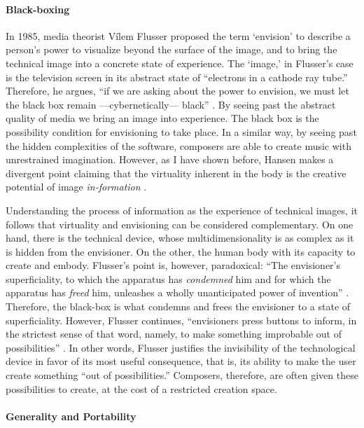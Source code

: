 	\paragraph{Black-boxing}

	In 1985, media theorist Vílem Flusser \parencite{Flu11:Int} proposed the term `envision' to describe a person's power to visualize beyond the surface of the image, and to bring the technical image into a concrete state of experience. The `image,' in Flusser's case is the television screen in its abstract state of ``electrons in a cathode ray tube.'' Therefore, he argues, ``if we are asking about the power to envision, we must let the black box remain ---cybernetically--- black'' \parencite[35]{Flu11:Int}. By seeing past the abstract quality of media we bring an image into experience. The black box is the possibility condition for envisioning to take place. In a similar way, by seeing past the hidden complexities of the software, composers are able to create music with unrestrained imagination. However, as I have shown before, Hansen makes a divergent point claiming that the virtuality inherent in the body is the creative potential of image \textit{in-formation} . 

	Understanding the process of information as the experience of technical images, it follows that virtuality and envisioning can be considered complementary. On one hand, there is the technical device, whose multidimensionality is as complex as it is hidden from the envisioner. On the other, the human body with its capacity to create and embody. Flusser's point is, however, paradoxical: ``The envisioner's superficiality, to which the apparatus has \textit{condemned} him and for which the apparatus has \textit{freed} him, unleashes a wholly unanticipated power of invention'' \im \parencite[37]{Flu11:Int}. Therefore, the black-box is what condemns and frees the envisioner to a state of superficiality. However, Flusser continues, ``envisioners press buttons to inform, in the strictest sense of that word, namely, to make something improbable out of possibilities'' \parencite[37]{Flu11:Int}. In other words, Flusser justifies the invisibility of the technological device in favor of its most useful consequence, that is, its ability to make the user create something ``out of possibilities.'' Composers, therefore, are often given these possibilities to create, at the cost of a restricted creation space.

	\paragraph{Generality and Portability}
	\label{computer:free}

